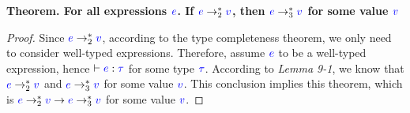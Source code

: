 \documentclass{article}
\newcommand{\meta}[1]{{\color{blue}#1}}
\begin{document}
\begin{enumerate}[leftmargin=*,itemindent=*,start=6,label={{\bf Problem \arabic*}.},ref=\arabic*]
\begin{enumerate}[(a)]
    \textbf{
      Theorem. For all expressions $\meta{e}$. If $\meta{e} \to_2^* \meta{v}$, then $\meta{e} \to_3^* \meta{v}$ for some value $\meta{v}$
    }
    \begin{proof}
      Since $\meta{e} \to_2^* \meta{v}$, according to the type completeness theorem, we only need to consider well-typed expressions. Therefore, assume $\meta{e}$ to be a well-typed expression, hence $\vdash \meta{e} : \meta{\tau}$ for some type $\meta{\tau}$. According to \textit{Lemma 9-1}, we know that $\meta{e} \to_2^* \meta{v}$ and $\meta{e} \to_3^* \meta{v}$ for some value $\meta{v}$. This conclusion implies this theorem, which is $\meta{e}\to_2^* \meta{v} \to \meta{e}\to_3^* \meta{v}$ for some value $\meta{v}$.

\end{proof}
\end{enumerate}
\end{enumerate}
\end{document}
